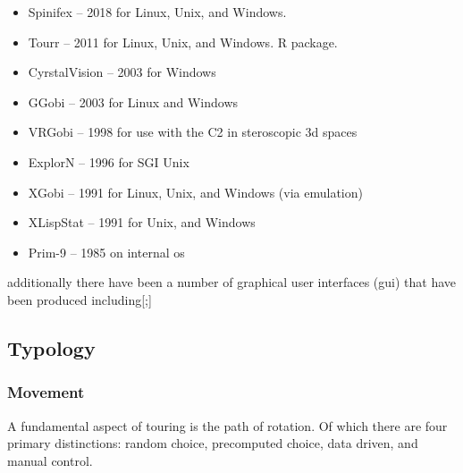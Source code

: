 \documentclass{monashthesis}
\begin{document}
\begin{itemize}
\tightlist
\item
  Spinifex\autocite{spinifex} -- 2018 for Linux, Unix, and Windows.
\item
  Tourr\autocite{wickham_tourr_2011} -- 2011 for Linux, Unix, and
  Windows. R package.
\item
  CyrstalVision\autocite{wegman_visual_2003} -- 2003 for Windows
\item
  GGobi\autocite{swayne_ggobi:_2003} -- 2003 for Linux and Windows
\item
  VRGobi\autocite{nelson_xgobi_1998} -- 1998 for use with the C2 in
  steroscopic 3d spaces
\item
  ExplorN\autocite{carr_explorn:_1996} -- 1996 for SGI Unix
\item
  XGobi\autocite{swayne_xgobi:_1991} -- 1991 for Linux, Unix, and
  Windows (via emulation)
\item
  XLispStat\autocite{tierney_lisp-stat:_1990} -- 1991 for Unix, and
  Windows
\item
  Prim-9\autocites{asimov_grand_1985}{fisherkeller_prim-9:_1974} -- 1985
  on internal os
\end{itemize}

additionally there have been a number of graphical user interfaces (gui)
that have been produced including{[}\textcite{huang_tourrgui:_2012};{]}

\subsection{Typology}\label{typology}

\subsubsection{Movement}\label{movement}

A fundamental aspect of touring is the path of rotation. Of which there
are four primary distinctions\autocite{buja_computational_2005}: random
choice, precomputed choice, data driven, and manual control.
\end{document}
